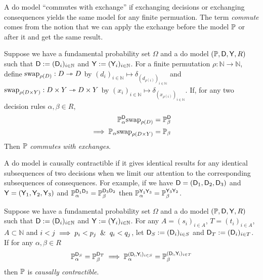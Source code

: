 A do model ``commutes with exchange'' if exchanging decisions or exchanging consequences yields the same model for any finite permuation. The term \emph{commute} comes from the notion that we can apply the exchange before the model $\mathbb{P}$ or after it and get the same result.

\begin{definition}\label{def:caus_exch}
Suppose we have a fundamental probability set $\Omega$ and a do model $(\mathbb{P},\mathsf{D},\mathsf{Y},R)$ such that $\mathsf{D}:=(\mathsf{D}_i)_{i\in \mathbb{N}}$ and $\mathsf{Y}:=(\mathsf{Y}_i)_{i\in\mathbb{N}}$. For a finite permutation $\rho:\mathbb{N}\to\mathbb{N}$, define $\text{swap}_{\rho(D)}:D\rightarrowtriangle D$ by $(d_i)_{i\in\mathbb{N}}\mapsto \delta_{(d_{\rho(i)})_{i\in\mathbb{N}}}$ and $\text{swap}_{\rho(D\times Y)}:D\times Y\rightarrowtriangle D\times Y$ by $(x_i)_{i\in\mathbb{N}}\mapsto \delta_{(x_{\rho(i)})_{i\in\mathbb{N}}}$. If, for any two decision rules $\alpha,\beta \in R$,
\begin{align}
    \mathbb{P}_\alpha^{\mathsf{D}}\text{swap}_{\rho(D)} &= \mathbb{P}_{\beta}^{\mathsf{D}}\\
    \implies  \mathbb{P}_\alpha\text{swap}_{\rho(D\times Y)}&=\mathbb{P}_\beta
\end{align}
Then $\mathbb{P}$ \emph{commutes with exchanges}.
\end{definition}

A do model is causally contractible if it gives identical results for any identical subsequences of two decisions when we limit our attention to the corresponding subsequences of consequences. For example, if we have $\mathsf{D}=(\mathsf{D}_1,\mathsf{D}_2,\mathsf{D}_3)$ and $\mathsf{Y}=(\mathsf{Y}_1,\mathsf{Y}_2,\mathsf{Y}_3)$ and $\mathbb{P}_\alpha^{\mathsf{D}_1\mathsf{D}_3}=\mathbb{P}_\beta^{\mathsf{D}_3\mathsf{D}_2}$ then $\mathbb{P}_{\alpha}^{\mathsf{Y}_1\mathsf{Y}_3}=\mathbb{P}_\beta^{\mathsf{Y}_3\mathsf{Y}_2}$.

\begin{definition}\label{def:caus_cont}
Suppose we have a fundamental probability set $\Omega$ and a do model $(\mathbb{P},\mathsf{D},\mathsf{Y},R)$ such that $\mathsf{D}:=(\mathsf{D}_i)_{i\in \mathbb{N}}$ and $\mathsf{Y}:=(\mathsf{Y}_i)_{i\in\mathbb{N}}$. For any $A=(s_i)_{i\in A}$, $T=(t_i)_{i\in A}$, $A\subset\mathbb{N}$ and $i<j\implies p_i<p_j \And q_i<q_j$, let $\mathsf{D}_S:=(\mathsf{D}_i)_{i\in S}$ and $\mathsf{D}_T:=(\mathsf{D}_i)_{i\in T}$. If for any $\alpha,\beta\in R$
\begin{align}
    \mathbb{P}_\alpha^{\mathsf{D}_{S}}=\mathbb{P}_\beta^{\mathsf{D}_{T}}\implies \mathbb{P}_\alpha^{(\mathsf{D_i,Y_i})_{i\in S}}=\mathbb{P}_\beta^{(\mathsf{D_i,Y_i})_{i\in T}}
\end{align}
then $\mathbb{P}$ is \emph{causally contractible}.
\end{definition}

